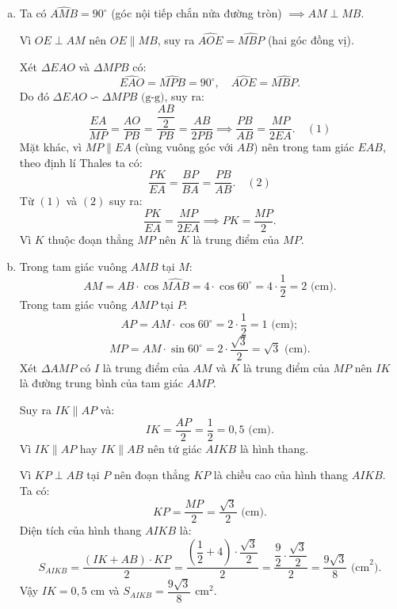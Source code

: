 \begin{bt}
{\begin{enumerate}[a)]
			Ta có $MP \perp AB$ tại $P \implies \widehat{MPA} = 90^\circ$.
			
			Ta có $MQ \perp AE$ tại $Q \implies \widehat{MQA} = 90^\circ$.
			
			Tứ giác $APMQ$ có ba góc vuông $\widehat{QAP} = \widehat{MPA} = \widehat{MQA} = 90^\circ$ nên là hình chữ nhật.
			
			Trong hình chữ nhật $APMQ$, hai đường chéo $AM$ và $PQ$ cắt nhau tại trung điểm của mỗi đường. Mà $I$ là trung điểm của $PQ$ nên $I$ cũng là trung điểm của $AM$.
			
			Lại có $EA = EM$ (tính chất hai tiếp tuyến cắt nhau) và $OA = OM = R$ nên $OE$ là đường trung trực của $AM$, suy ra $OE$ đi qua trung điểm $I$ của $AM$.
			
			Do đó ba điểm $O, E, I$ thẳng hàng.
			\item Ta có $\widehat{AMB} = 90^\circ$ (góc nội tiếp chắn nửa đường tròn) $\implies AM \perp MB$.
			
			Vì $OE \perp AM$ nên $OE \parallel MB$, suy ra $\widehat{AOE} = \widehat{MBP}$ (hai góc đồng vị).
			
			Xét $\Delta EAO$ và $\Delta MPB$ có:
			$$\widehat{EAO} = \widehat{MPB} = 90^\circ,\quad \widehat{AOE} = \widehat{MBP}.$$
			Do đó $\Delta EAO \backsim \Delta MPB\text{ (g-g)}$, suy ra:
			$$\dfrac{EA}{MP} = \dfrac{AO}{PB} = \dfrac{\dfrac{AB}{2}}{PB} = \dfrac{AB}{2PB} \implies \dfrac{PB}{AB} = \dfrac{MP}{2EA}. \quad (1)$$
			Mặt khác, vì $MP \parallel EA$ (cùng vuông góc với $AB$) nên trong tam giác $EAB$, theo định lí Thales ta có:
			$$\dfrac{PK}{EA} = \dfrac{BP}{BA} = \dfrac{PB}{AB}. \quad (2)$$
			Từ $(1)$ và $(2)$ suy ra:
			$$\dfrac{PK}{EA} = \dfrac{MP}{2EA} \implies PK = \dfrac{MP}{2}.$$
			Vì $K$ thuộc đoạn thẳng $MP$ nên $K$ là trung điểm của $MP$.
			\item Trong tam giác vuông $AMB$ tại $M$:
			$$AM = AB \cdot \cos\widehat{MAB} = 4 \cdot \cos 60^\circ = 4 \cdot \dfrac{1}{2} = 2\text{ (cm)}.$$
			Trong tam giác vuông $AMP$ tại $P$:
			$$AP = AM \cdot \cos 60^\circ = 2 \cdot \dfrac{1}{2} = 1\text{ (cm)};$$
			$$MP = AM \cdot \sin 60^\circ = 2 \cdot \dfrac{\sqrt{3}}{2} = \sqrt{3}\text{ (cm)}.$$
			Xét $\Delta AMP$ có $I$ là trung điểm của $AM$ và $K$ là trung điểm của $MP$ nên $IK$ là đường trung bình của tam giác $AMP$.
			
			Suy ra $IK \parallel AP$ và:
			$$IK = \dfrac{AP}{2} = \dfrac{1}{2} = 0{,}5\text{ (cm)}.$$
			Vì $IK \parallel AP$ hay $IK \parallel AB$ nên tứ giác $AIKB$ là hình thang.
			
			Vì $KP \perp AB$ tại $P$ nên đoạn thẳng $KP$ là chiều cao của hình thang $AIKB$. Ta có:
			$$KP = \dfrac{MP}{2} = \dfrac{\sqrt{3}}{2}\text{ (cm)}.$$
			Diện tích của hình thang $AIKB$ là:
			$$S_{AIKB} = \dfrac{(IK + AB) \cdot KP}{2} = \dfrac{\left(\dfrac{1}{2} + 4\right) \cdot \dfrac{\sqrt{3}}{2}}{2} = \dfrac{\dfrac{9}{2} \cdot \dfrac{\sqrt{3}}{2}}{2} = \dfrac{9\sqrt{3}}{8}\text{ (cm}^2).$$
			Vậy $IK = 0{,}5\text{ cm}$ và $S_{AIKB} = \dfrac{9\sqrt{3}}{8}\text{ cm}^2$.
		\end{enumerate}
	}
\end{bt}
